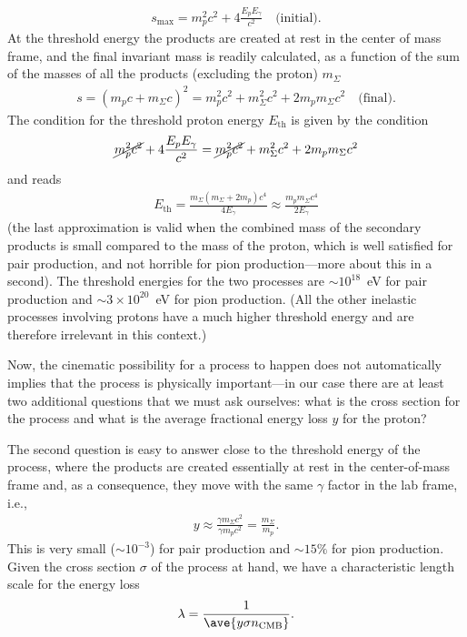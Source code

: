 \begin{align*}
  s_\text{max} = m_p^2 c^2 + 4 \frac{E_p E_\gamma}{c^2} \quad\text{(initial)}.
\end{align*}
At the threshold energy the products are created at rest in the center of mass
frame, and the final invariant mass is readily calculated, as a function of the
sum of the masses of all the products (excluding the proton) $m_\Sigma$
\begin{align*}
  s = (m_p c + m_\Sigma c)^2 =
  m_p^2 c^2 + m_\Sigma^2 c^2 + 2 m_p m_\Sigma c^2 \quad\text{(final)}.
\end{align*}
The condition for the threshold proton energy $E_\text{th}$ is given by the condition
\begin{align*}
  \cancel{m_p^2 c^2} + 4 \frac{E_p E_\gamma}{c^2} =
  \cancel{m_p^2 c^2} + m_\Sigma^2c^2 + 2 m_p m_\Sigma c^2
\end{align*}
and reads
\begin{align}
  E_\text{th} = \frac{m_\Sigma (m_\Sigma + 2 m_p) c^4}{4E_\gamma} \approx
  \frac{m_p m_\Sigma c^4}{2E_\gamma}
\end{align}
(the last approximation is valid when the combined mass of the secondary products
is small compared to the mass of the proton, which is well satisfied for pair
production, and not horrible for pion production---more about this in a second).
The threshold energies for the two processes are $\sim 10^{18}$~eV for pair production
and $\sim 3 \times 10^{20}$~eV for pion production. (All the other inelastic processes
involving protons have a much higher threshold energy and are therefore irrelevant
in this context.)

Now, the cinematic possibility for a process to happen does not automatically implies
that the process is physically important---in our case there are at least two
additional questions that we must ask ourselves: what is the cross section for the
process and what is the average fractional energy loss $y$ for the proton?

The second question is easy to answer close to the threshold energy of the process,
where the products are created essentially at rest in the center-of-mass frame and,
as a consequence, they move with the same $\gamma$ factor in the lab frame, i.e.,
\begin{align}
  y \approx \frac{\gamma m_\Sigma c^2}{\gamma m_p c^2} = \frac{m_\Sigma}{m_p}.
\end{align}
This is very small ($\sim 10^{-3}$) for pair production and $\sim 15\%$ for pion
production. Given the cross section $\sigma$ of the process at hand, we have a
characteristic length scale for the energy loss
\begin{align}
  \lambda = \frac{1}{\ave{y \sigma n_\text{CMB}}}.
\end{align}



